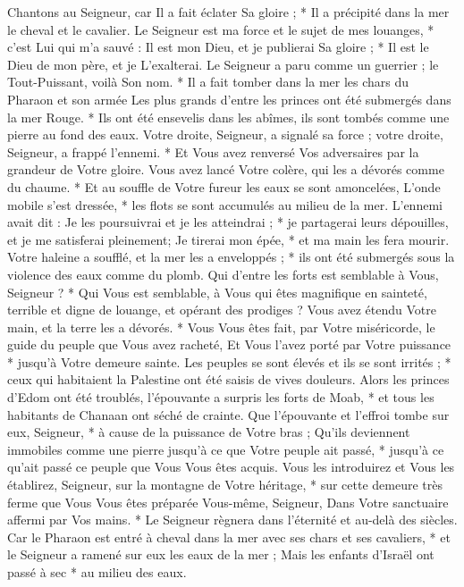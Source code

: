  Chantons au Seigneur, car Il a fait éclater Sa gloire ; * Il a précipité dans la mer le cheval et le cavalier.
\versseparator
 Le Seigneur est ma force et le sujet de mes louanges, * c'est Lui qui m'a sauvé :
\versseparator
 Il est mon Dieu, et je publierai Sa gloire ; * Il est le Dieu de mon père, et je L'exalterai.
\versseparator
 Le Seigneur a paru comme un guerrier ; le Tout-Puissant, voilà Son nom. * Il a fait tomber dans la mer les chars du Pharaon et son armée
\versseparator
 Les plus grands d'entre les princes ont été submergés dans la mer Rouge. * Ils ont été ensevelis dans les abîmes, ils sont tombés comme une pierre au fond des eaux.
\versseparator
 Votre droite, Seigneur, a signalé sa force ; votre droite, Seigneur, a frappé l'ennemi. * Et Vous avez renversé Vos adversaires par la grandeur de Votre gloire.
\versseparator
 Vous avez lancé Votre colère, qui les a dévorés comme du chaume. * Et au souffle de Votre fureur les eaux se sont amoncelées,
\versseparator
 L'onde mobile s'est dressée, * les flots se sont accumulés au milieu de la mer.
\versseparator
 L'ennemi avait dit : Je les poursuivrai et je les atteindrai ; * je partagerai leurs dépouilles, et je me satisferai pleinement;
\versseparator
 Je tirerai mon épée, * et ma main les fera mourir.
\versseparator
 Votre haleine a soufflé, et la mer les a enveloppés ; * ils ont été submergés sous la violence des eaux comme du plomb.
\versseparator
 Qui d'entre les forts est semblable à Vous, Seigneur ? * Qui Vous est semblable, à Vous qui êtes magnifique en sainteté, terrible et digne de louange, et opérant des prodiges ?
\versseparator
 Vous avez étendu Votre main, et la terre les a dévorés. * Vous Vous êtes fait, par Votre miséricorde, le guide du peuple que Vous avez racheté,
\versseparator
 Et Vous l'avez porté par Votre puissance * jusqu'à Votre demeure sainte.
\versseparator
 Les peuples se sont élevés et ils se sont irrités ; * ceux qui habitaient la Palestine ont été saisis de vives douleurs.
\versseparator
 Alors les princes d'Edom ont été troublés, l'épouvante a surpris les forts de Moab, * et tous les habitants de Chanaan ont séché de crainte.
\versseparator
 Que l'épouvante et l'effroi tombe sur eux, Seigneur, * à cause de la puissance de Votre bras ;
\versseparator
 Qu'ils deviennent immobiles comme une pierre jusqu'à ce que Votre peuple ait passé, * jusqu'à ce qu'ait passé ce peuple que Vous Vous êtes acquis.
\versseparator
 Vous les introduirez et Vous les établirez, Seigneur, sur la montagne de Votre héritage, * sur cette demeure très ferme que Vous Vous êtes préparée Vous-même, Seigneur,
\versseparator
 Dans Votre sanctuaire affermi par Vos mains. * Le Seigneur règnera dans l'éternité et au-delà des siècles.
\versseparator
 Car le Pharaon est entré à cheval dans la mer avec ses chars et ses cavaliers, * et le Seigneur a ramené sur eux les eaux de la mer ;
\versseparator
 Mais les enfants d'Israël ont passé à sec * au milieu des eaux.